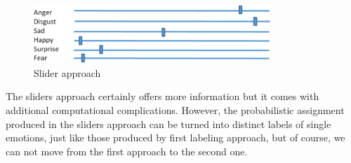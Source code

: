\begin{figure}[H]
\centering
\includegraphics[width=0.8\textwidth]{./chapters/chapter1/images/emotion_labeling_sliders}
\caption{Slider approach\cite{microsoft}}
\label{fig:emotion_labeling_sliders}
\end{figure}

The sliders approach certainly offers more information but it comes with additional computational complications. However, the probabilistic assignment produced in the sliders approach can be turned into distinct labels of single emotions, just like those produced by first labeling approach, but of course, we can not move from the first approach to the second one. 

